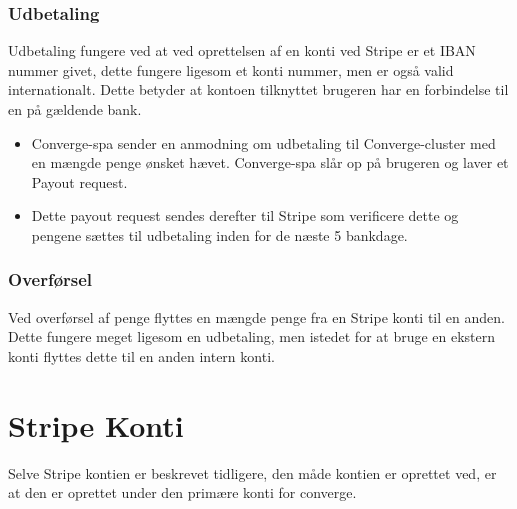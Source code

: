 \subsubsection{Udbetaling}

Udbetaling fungere ved at ved oprettelsen af en konti ved Stripe er et IBAN nummer givet, dette fungere ligesom et konti nummer, men er også valid internationalt. Dette betyder at kontoen tilknyttet brugeren har en forbindelse til en på gældende bank.

\begin{itemize}
    \item Converge-spa sender en anmodning om udbetaling til Converge-cluster med en mængde penge ønsket hævet. Converge-spa slår op på brugeren og laver et Payout request.
    \item Dette payout request sendes derefter til Stripe som verificere dette og pengene sættes til udbetaling inden for de næste 5 bankdage.
\end{itemize}

\subsubsection{Overførsel}

Ved overførsel af penge flyttes en mængde penge fra en Stripe konti til en anden. Dette fungere meget ligesom en udbetaling, men istedet for at bruge en ekstern konti flyttes dette til en anden intern konti.

\section{Stripe Konti}

Selve Stripe kontien er beskrevet tidligere, den måde kontien er oprettet ved, er at den er oprettet under den primære konti for converge.